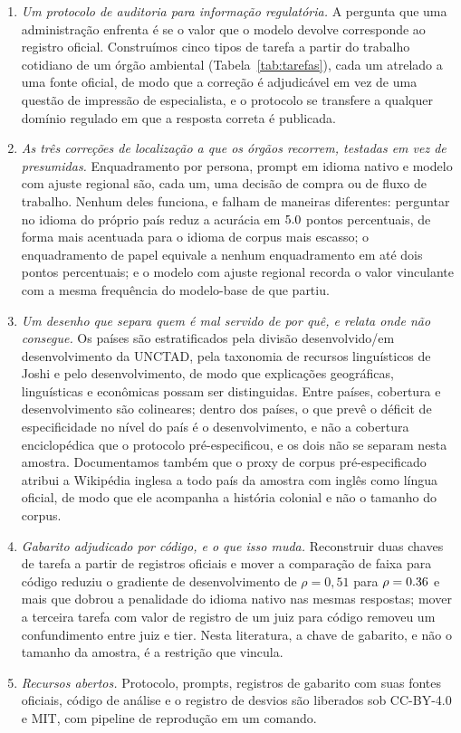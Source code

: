 \begin{enumerate}\setlength{\itemsep}{2pt}
\item \emph{Um protocolo de auditoria para informação regulatória.} A pergunta
  que uma administração enfrenta é se o valor que o modelo devolve corresponde
  ao registro oficial. Construímos cinco tipos de tarefa a partir do trabalho
  cotidiano de um órgão ambiental (Tabela~\ref{tab:tarefas}), cada um atrelado a
  uma fonte oficial, de modo que a correção é adjudicável em vez de uma questão
  de impressão de especialista, e o protocolo se transfere a qualquer domínio
  regulado em que a resposta correta é publicada.
\item \emph{As três correções de localização a que os órgãos recorrem,
  testadas em vez de presumidas.} Enquadramento por persona, prompt em idioma
  nativo e modelo com ajuste regional são, cada um, uma decisão de compra ou de
  fluxo de trabalho. Nenhum deles funciona, e falham de maneiras diferentes:
  perguntar no idioma do próprio país reduz a acurácia em $5.0$ pontos
  percentuais, de forma mais acentuada para o idioma de corpus mais escasso; o
  enquadramento de papel equivale a nenhum enquadramento em até dois pontos
  percentuais; e o modelo com ajuste regional recorda o valor vinculante com a
  mesma frequência do modelo-base de que partiu.
\item \emph{Um desenho que separa quem é mal servido de por quê, e relata onde
  não consegue.} Os países são estratificados pela divisão desenvolvido/em
  desenvolvimento da UNCTAD, pela taxonomia de recursos linguísticos de Joshi e
  pelo desenvolvimento, de modo que explicações geográficas, linguísticas e
  econômicas possam ser distinguidas. Entre países, cobertura e desenvolvimento
  são colineares; dentro dos países, o que prevê o déficit de especificidade no
  nível do país é o desenvolvimento, e não a cobertura enciclopédica que o
  protocolo pré-especificou, e os dois não se separam nesta amostra. Documentamos também
  que o proxy de corpus pré-especificado atribui a Wikipédia inglesa a todo
  país da amostra com inglês como língua oficial, de modo que ele acompanha a
  história colonial e não o tamanho do corpus.
\item \emph{Gabarito adjudicado por código, e o que isso muda.} Reconstruir
  duas chaves de tarefa a partir de registros oficiais e mover a comparação de
  faixa para código reduziu o gradiente de desenvolvimento de $\rho=0,51$ para
  $\rho=0.36$ e mais que dobrou a penalidade do idioma nativo nas mesmas
  respostas; mover a terceira tarefa com valor de registro de um juiz para
  código removeu um confundimento entre juiz e tier. Nesta literatura, a chave
  de gabarito, e não o tamanho da amostra, é a restrição que vincula.
\item \emph{Recursos abertos.} Protocolo, prompts, registros de gabarito com
  suas fontes oficiais, código de análise e o registro de desvios são liberados
  sob CC-BY-4.0 e MIT, com pipeline de reprodução em um comando.
\end{enumerate}
